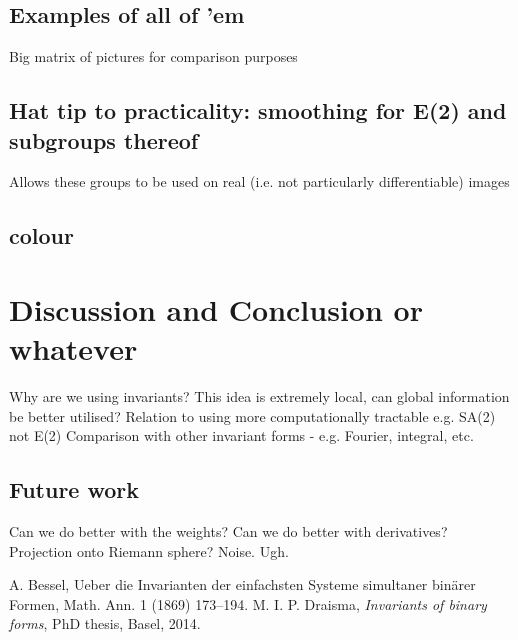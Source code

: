 \documentclass{article}
\begin{document}
\subsection{Examples of all of 'em}
Big matrix of pictures for comparison purposes

\subsection{Hat tip to practicality: smoothing for E(2) and subgroups thereof}
Allows these groups to be used on real (i.e. not particularly
differentiable) images

\subsection{colour}

\section{Discussion and Conclusion or whatever}
Why are we using invariants? 
This idea is extremely local, can global information be better utilised?
Relation to using more computationally
tractable e.g. SA(2) not E(2)
Comparison with other invariant forms - e.g. Fourier, integral, etc.

\subsection{Future work}
Can we do better with the weights?
Can we do better with derivatives?
Projection onto Riemann sphere?
Noise. Ugh.

\begin{thebibliography}{99}
 A. Bessel, Ueber die Invarianten der einfachsten Systeme simultaner bin\"arer Formen, Math. Ann. 1 (1869) 173--194.
 M. I. P. Draisma, {\em Invariants of binary forms}, PhD thesis, Basel, 2014.
\end{thebibliography}
\end{document}
